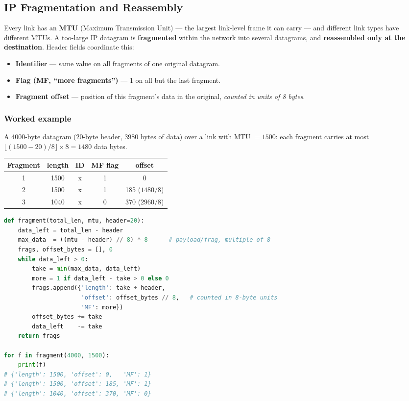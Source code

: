 \documentclass[hidelinks]{article}
\begin{document}
\subsection{IP Fragmentation and Reassembly}

Every link has an \textbf{MTU} (Maximum Transmission Unit) --- the largest
link-level frame it can carry --- and different link types have different
MTUs. A too-large IP datagram is \textbf{fragmented} within the network into
several datagrams, and \textbf{reassembled only at the destination}. Header
fields coordinate this:
\begin{itemize}
    \item \textbf{Identifier} --- same value on all fragments of one original
    datagram.
    \item \textbf{Flag (MF, ``more fragments'')} --- 1 on all but the last
    fragment.
    \item \textbf{Fragment offset} --- position of this fragment's data in the
    original, \emph{counted in units of 8 bytes}.
\end{itemize}

\subsubsection{Worked example}
A 4000-byte datagram (20-byte header, 3980 bytes of data) over a link with
MTU $=1500$: each fragment carries at most $\lfloor(1500-20)/8\rfloor\times 8
= 1480$ data bytes.

\renewcommand{\arraystretch}{1.3}
\noindent\begin{tabularx}{\textwidth}{|c|c|c|c|c|}
\hline
\textbf{Fragment} & \textbf{length} & \textbf{ID} & \textbf{MF flag} & \textbf{offset} \\
\hline
1 & 1500 & x & 1 & 0 \\
\hline
2 & 1500 & x & 1 & 185 \quad($1480/8$) \\
\hline
3 & 1040 & x & 0 & 370 \quad($2960/8$) \\
\hline
\end{tabularx}

\begin{lstlisting}[language=Python, caption={Computing IPv4 fragments (offset in 8-byte units)}]
def fragment(total_len, mtu, header=20):
    data_left = total_len - header
    max_data  = ((mtu - header) // 8) * 8      # payload/frag, multiple of 8
    frags, offset_bytes = [], 0
    while data_left > 0:
        take = min(max_data, data_left)
        more = 1 if data_left - take > 0 else 0
        frags.append({'length': take + header,
                      'offset': offset_bytes // 8,   # counted in 8-byte units
                      'MF': more})
        offset_bytes += take
        data_left    -= take
    return frags

for f in fragment(4000, 1500):
    print(f)
# {'length': 1500, 'offset': 0,   'MF': 1}
# {'length': 1500, 'offset': 185, 'MF': 1}
# {'length': 1040, 'offset': 370, 'MF': 0}
\end{lstlisting}
\end{document}

